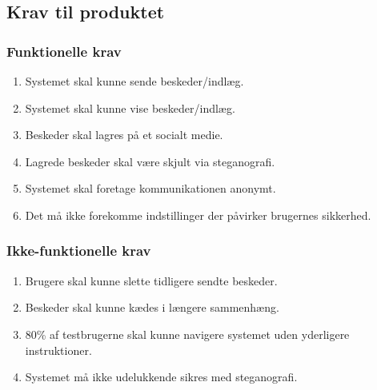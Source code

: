 \subsection{Krav til produktet}
\begin{itemize}
  \subsubsection{Funktionelle krav}
      \begin{enumerate}
        \item Systemet skal kunne sende beskeder/indlæg.
        \item Systemet skal kunne vise beskeder/indlæg.
        \item Beskeder skal lagres på et socialt medie.
        \item Lagrede beskeder skal være skjult via steganografi.
        \item Systemet skal foretage kommunikationen anonymt.
        \item Det må ikke forekomme indstillinger der påvirker brugernes sikkerhed.
      \end{enumerate}
  \subsubsection{Ikke-funktionelle krav}
      \begin{enumerate}
        \item Brugere skal kunne slette tidligere sendte beskeder.
        \item Beskeder skal kunne kædes i længere sammenhæng.
        \item 80\% af testbrugerne skal kunne navigere systemet uden yderligere instruktioner.
        \item Systemet må ikke udelukkende sikres med steganografi.
      \end{enumerate}  
\end{itemize}

